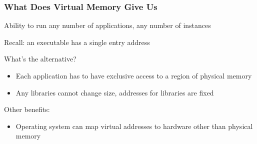 \documentclass[aspectratio=169]{beamer}
\begin{document}
  \begin{frame}
    \frametitle{What Does Virtual Memory Give Us}

    Ability to run any number of applications, any number of instances

    \hspace{1em} Recall: an executable has a single entry address

    \vspace{2em}

    What's the alternative?

    \begin{itemize}
      \item Each application has to have exclusive access to a region of
            physical memory
      \item Any libraries cannot change size, addresses for libraries are fixed
    \end{itemize}

    \vspace{2em}

    Other benefits:
    \begin{itemize}
      \item Operating system can map virtual addresses to hardware other than
            physical memory
    \end{itemize}
  \end{frame}
\end{document}
